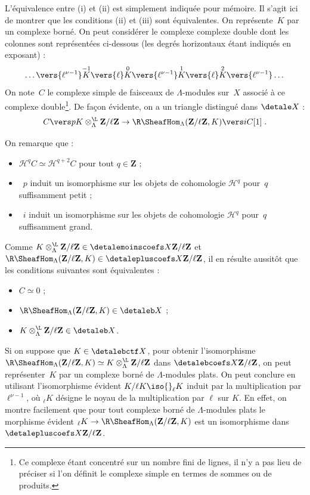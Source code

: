 \documentclass[10pt]{../fichiers-configuration-latex/smfart}
\begin{document}
L'équivalence entre (i) et (ii) est simplement indiquée pour mémoire. Il
s'agit ici de montrer que les conditions (ii) et (iii) sont équivalentes.
On représente $K$ par un complexe borné. On peut considérer le complexe
complexe double dont les colonnes sont représentées ci-dessous (les degrés
horizontaux étant indiqués en exposant) :
\[\dots\vers {\ell^{\nu-1}} \overset {-1} K\vers {\ell}
\overset 0 K \vers {\ell^{\nu-1}} \overset 1 K\vers
{\ell}\overset 2 K \vers {\ell^{\nu-1}} \dots \]
On note $C$ le complexe simple de faisceaux de
$\Lambda$-modules sur $X$ associé à ce complexe
double\;\footnote{Ce complexe étant concentré sur un nombre fini de lignes,
il n'y a pas lieu de préciser si l'on définit le complexe simple en termes
de sommes ou de produits.}. De façon évidente, on a un triangle distingué
dans $\detale X$ :
\[
C\vers p K\otimes_{\Lambda}^{\L}\mathbf{Z}/\ell\mathbf{Z}\to
\R\SheafHom_\Lambda(\mathbf{Z}/\ell\mathbf{Z},K)\vers i
C[1]\;\text{.}
\]

On remarque que :
\begin{itemize}
\item ${\mathscr H}^qC\simeq {\mathscr H}^{q+2}C$ pour tout
$q\in\mathbf{Z}$ ;
\item $p$ induit un isomorphisme sur les objets de cohomologie
${\mathscr H}^q$ pour $q$ suffisamment petit ;
\item $i$ induit un isomorphisme sur les objets de cohomologie
${\mathscr H}^q$ pour $q$ suffisamment grand.
\end{itemize}

Comme
$K\otimes_{\Lambda}^{\L}\mathbf{Z}/\ell\mathbf{Z}\in\detalemoinscoefs X 
{\mathbf{Z}/\ell\mathbf{Z}}$ et 
$\R\SheafHom_\Lambda(\mathbf{Z}/\ell\mathbf{Z},K)\in \detalepluscoefs X 
{\mathbf{Z}/\ell\mathbf{Z}}$, il en résulte aussitôt que les conditions
suivantes sont équivalentes :
\begin{itemize}
\item $C\simeq 0$ ;
\item $\R\SheafHom_\Lambda(\mathbf{Z}/\ell\mathbf{Z},K)\in\detaleb X$ ;
\item $K\otimes_{\Lambda}^{\L}\mathbf{Z}/\ell\mathbf{Z}\in\detaleb X$.
\end{itemize}

Si on suppose que $K\in\detalebctf X$, 
pour obtenir l'isomorphisme 
$\R\SheafHom_\Lambda(\mathbf{Z}/\ell\mathbf{Z},K)\simeq
K\otimes_{\Lambda}^{\L}\mathbf{Z}/\ell\mathbf{Z}$ dans $\detalebcoefs X
{\mathbf{Z}/\ell\mathbf{Z}}$, on peut représenter $K$ par un complexe borné
de $\Lambda$-modules plats. On peut conclure en utilisant l'isomorphisme
évident $K/\ell K \iso {}_\ell K$ induit 
par la multiplication par $\ell^{\nu-1}$, où ${}_\ell K$ désigne le
noyau de la multiplication par $\ell$ sur $K$. En effet, on montre
facilement que pour tout complexe
borné de $\Lambda$-modules plats le morphisme évident ${}_\ell K\to
\R\SheafHom_\Lambda(\mathbf{Z}/\ell\mathbf{Z},K)$ est un isomorphisme
dans $\detalepluscoefs X {\mathbf{Z}/\ell\mathbf{Z}}$.
\end{document}
